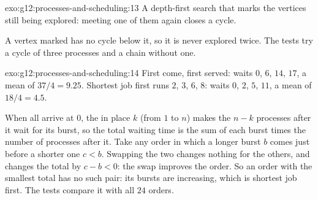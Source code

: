 \begin{solution}{exo:g12:processes-and-scheduling:13}
A depth-first search that marks the vertices still being explored: meeting one of them again closes a cycle.

\smallskip\noindent\hspace*{2em}

\noindent\hspace*{4em}

\noindent\hspace*{4em}

\noindent\hspace*{6em}

\noindent\hspace*{6em}

\noindent\hspace*{8em}

\noindent\hspace*{10em}

\noindent\hspace*{6em}

\noindent\hspace*{6em}

\noindent\hspace*{4em}

\smallskip\noindent A vertex marked  has no cycle below it, so it is never explored twice. The tests try a
cycle of three processes and a chain without one.
\end{solution}

\begin{solution}{exo:g12:processes-and-scheduling:14}
First come, first served: waits $0$, $6$, $14$, $17$, a mean of $37/4 = 9.25$. Shortest job first runs $2$, $3$, $6$,
$8$: waits $0$, $2$, $5$, $11$, a mean of $18/4 = 4.5$.

When all arrive at $0$, the  in place $k$ (from $1$ to $n$) makes the $n - k$ processes after it wait for its
burst, so the total waiting time is the sum of each burst times the number of processes after it. Take any order in
which a longer burst $b$ comes just before a shorter one $c < b$. Swapping the two changes nothing for the others,
and changes the total by $c - b < 0$: the swap improves the order. So an order with the smallest total has no such
pair: its bursts are increasing, which is shortest job first. The tests compare it with all $24$ orders.
\end{solution}

